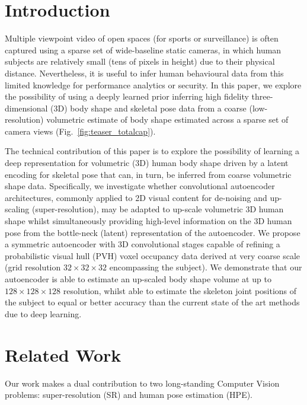 \documentclass[runningheads]{llncs}
\begin{document}
\section{Introduction}

Multiple viewpoint video of open spaces (\eg for sports or surveillance) is often captured using a sparse set of wide-baseline static cameras, in which human subjects are relatively small (tens of pixels in height) due to their physical distance.  Nevertheless, it is useful to infer human behavioural data from this limited knowledge for performance analytics or security.  In this paper, we explore the possibility of using a deeply learned prior inferring high fidelity three-dimensional (3D) body shape and skeletal pose data from a coarse (low-resolution) volumetric estimate of body shape estimated across a sparse set of camera views (Fig.~\ref{fig:teaser_totalcap}).

The technical contribution of this paper is to explore the possibility of learning a deep representation for volumetric (3D) human body shape driven by a latent encoding for skeletal pose that can, in turn, be inferred from coarse volumetric shape data.  Specifically, we investigate whether convolutional autoencoder architectures, commonly applied to 2D visual content for de-noising and up-scaling (super-resolution),  may be adapted to up-scale volumetric 3D human shape whilst simultaneously providing high-level information on the 3D human pose from the bottle-neck (latent) representation of the autoencoder.   We propose a symmetric autoencoder with 3D convolutional stages capable of refining a probabilistic visual hull (PVH) \cite{Grauman2003} \ie voxel occupancy data derived at very coarse scale (grid resolution $32 \times 32 \times 32$ encompassing the subject).  We demonstrate that our autoencoder is able to estimate an up-scaled body shape volume at up to $128 \times 128 \times 128$ resolution, whilst able to estimate the skeleton joint positions of the subject to equal or better accuracy than the current state of the art methods due to deep learning.

\section{Related Work}

Our work makes a dual contribution to two long-standing Computer Vision problems: super-resolution (SR) and human pose estimation (HPE).
\end{document}
